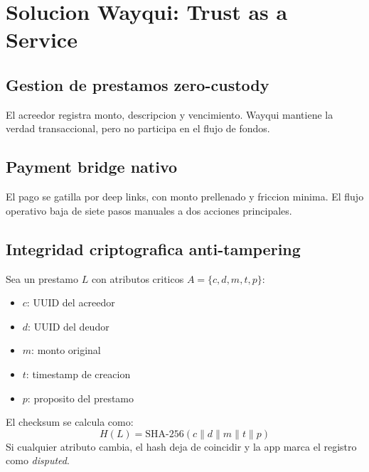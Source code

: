 \documentclass[11pt,a4paper]{article}
\begin{document}
\section{Solucion Wayqui: Trust as a Service}
\subsection{Gestion de prestamos zero-custody}
El acreedor registra monto, descripcion y vencimiento. Wayqui mantiene la verdad transaccional, pero no participa en el flujo de fondos.

\subsection{Payment bridge nativo}
El pago se gatilla por deep links, con monto prellenado y friccion minima. El flujo operativo baja de siete pasos manuales a dos acciones principales.

\subsection{Integridad criptografica anti-tampering}
Sea un prestamo $L$ con atributos criticos $A=\{c,d,m,t,p\}$:
\begin{itemize}[leftmargin=1.1cm]
	\item $c$: UUID del acreedor
	\item $d$: UUID del deudor
	\item $m$: monto original
	\item $t$: timestamp de creacion
	\item $p$: proposito del prestamo
\end{itemize}

El checksum se calcula como:
\[
H(L)=\text{SHA-256}(c \parallel d \parallel m \parallel t \parallel p)
\]
Si cualquier atributo cambia, el hash deja de coincidir y la app marca el registro como \textit{disputed}.
\end{document}
